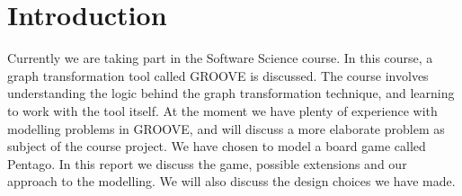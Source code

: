 \section{Introduction}
\label{Introduction}
Currently we are taking part in the Software Science course. In this course, a graph transformation tool called GROOVE is discussed. The course involves understanding the logic behind the graph transformation technique, and learning to work with the tool itself. At the moment we have plenty of experience with modelling problems in GROOVE, and will discuss a more elaborate problem as subject of the course project. We have chosen to model a board game called Pentago. In this report we discuss the game, possible extensions and our approach to the modelling. We will also discuss the design choices we have made.